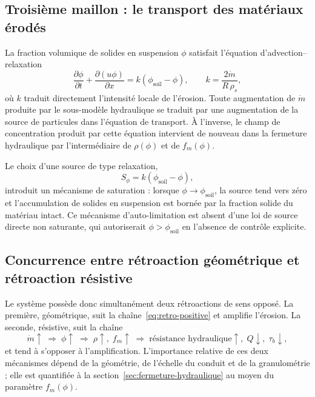 \documentclass[11pt,a4paper]{report}
\newcommand{\phisol}{\phi_{\mathrm{soil}}}
\newcommand{\mdot}{\dot{m}}
\begin{document}
\subsection{Troisième maillon : le transport des matériaux érodés}

La fraction volumique de solides en suspension \(\phi\) satisfait l'équation d'advection--relaxation
\begin{equation}
\frac{\partial\phi}{\partial t} + \frac{\partial(u\phi)}{\partial x} = k\left(\phisol - \phi\right),
\qquad
k = \frac{2\mdot}{R\,\rho_s},
\label{eq:transport}
\end{equation}
où \(k\) traduit directement l'intensité locale de l'érosion. Toute augmentation de \(\mdot\) produite par
le sous-modèle hydraulique se traduit par une augmentation de la source de particules dans l'équation de
transport. À l'inverse, le champ de concentration produit par cette équation intervient de nouveau dans
la fermeture hydraulique par l'intermédiaire de \(\rho(\phi)\) et de \(f_m(\phi)\).

Le choix d'une source de type relaxation,
\begin{equation}
S_\phi = k\left(\phisol - \phi\right),
\label{eq:source-phi}
\end{equation}
introduit un mécanisme de saturation : lorsque \(\phi \to \phisol\), la source tend vers zéro et
l'accumulation de solides en suspension est bornée par la fraction solide du matériau intact. Ce mécanisme
d'auto-limitation est absent d'une loi de source directe non saturante, qui autoriserait
\(\phi > \phisol\) en l'absence de contrôle explicite.

\subsection{Concurrence entre rétroaction géométrique et rétroaction résistive}

Le système possède donc simultanément deux rétroactions de sens opposé. La première, géométrique, suit la
chaîne~\eqref{eq:retro-positive} et amplifie l'érosion. La seconde, résistive, suit la chaîne
\begin{equation}
\mdot \uparrow \;\Rightarrow\; \phi \uparrow \;\Rightarrow\; \rho \uparrow,\; f_m \uparrow
\;\Rightarrow\; \text{résistance hydraulique} \uparrow,\; Q \downarrow,\; \tau_b \downarrow,
\label{eq:retro-negative}
\end{equation}
et tend à s'opposer à l'amplification. L'importance relative de ces deux mécanismes dépend de la
géométrie, de l'échelle du conduit et de la granulométrie ; elle est quantifiée à la
section~\ref{sec:fermeture-hydraulique} au moyen du paramètre \(f_m(\phi)\).
\end{document}
